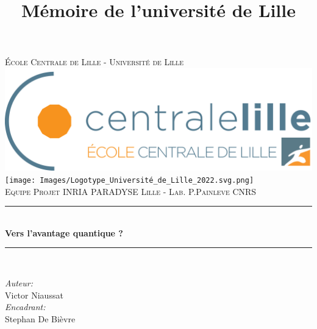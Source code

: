 \documentclass{article}
\title{Mémoire de l'université de Lille}
\begin{document}
\begin{titlepage}

\newcommand{\HRule}{\rule{\linewidth}{0.5mm}} %

\center
 

\textsc{\LARGE \'E{}cole Centrale de Lille - Université de Lille}\\[1.5cm] 
\includegraphics[scale=0.1]{Images/Centrale_Lille.png}\\[2cm]
\texttt{[image: Images/Logotype\_Université\_de\_Lille\_2022.svg.png]}\\[2cm]


\textsc{\Large Equipe Projet INRIA PARADYSE Lille - Lab. P.Painleve CNRS }\\[0.5cm] 


\HRule \\[0.4cm]
{ \huge \bfseries Vers l'avantage quantique ?}\\[0.4cm] 
\large 
\HRule \\[1.5cm]
 

\begin{minipage}{0.4\textwidth}
\begin{flushleft} \large
\emph{Auteur:}\\
Victor Niaussat \\ 

\emph{Encadrant:}\\
Stephan De Bièvre \\ 




\end{flushleft}
\end{minipage}
\end{titlepage}
\end{document}
